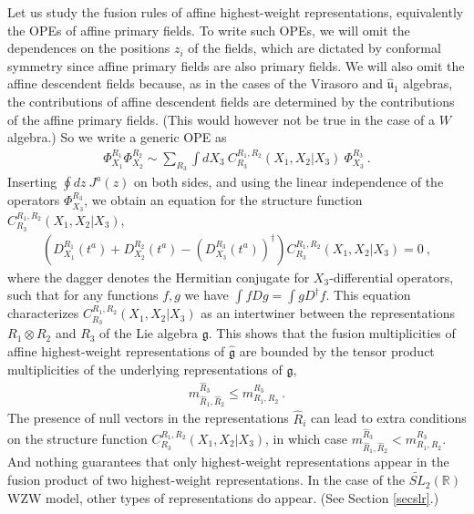 \documentclass[12pt,a4paper,notitlepage]{report}
\numberwithin{equation}{section}
\theoremstyle{break}
\begin{document}
Let us study the fusion rules of affine highest-weight representations, equivalently the OPEs of affine primary fields. To write such OPEs, we will omit the dependences on the positions $z_i$ of the fields, which are dictated by conformal symmetry since affine primary fields are also primary fields. We will also omit the affine descendent fields because, as in the cases of the Virasoro and $\hat{\mathfrak{u}}_1$ algebras, the contributions of affine descendent fields are determined by the contributions of the affine primary fields. (This would however not be true in the case of a $W$ algebra.) So we write a generic OPE as 
\begin{align}
 \Phi^{R_1}_{X_1}\Phi^{R_2}_{X_2} \sim \sum_{R_3} \int dX_3\ C^{R_1,R_2}_{R_3}(X_1,X_2|X_3)\ \Phi^{R_3}_{X_3}\ .
\end{align}
Inserting $\oint dz\ J^a(z)$ on both sides, and using the linear independence of the operators $\Phi^{R_3}_{X_3}$, we obtain an equation for the structure function $C^{R_1,R_2}_{R_3}(X_1,X_2|X_3)$,
\begin{align}
 \left(D_{X_1}^{R_1}(t^a)+D_{X_2}^{R_2}(t^a)-\left(D_{X_3}^{R_3}(t^a)\right)^\dagger\right) C^{R_1,R_2}_{R_3}(X_1,X_2|X_3) = 0\ ,
\label{dddc}
\end{align}
where the dagger denotes the Hermitian conjugate for $X_3$-differential operators, such that for any functions $f,g$ we have 
$\int fDg =\int g D^\dagger f$. This equation characterizes $C^{R_1,R_2}_{R_3}(X_1,X_2|X_3)$ as an intertwiner between the representations $R_1\otimes R_2$ and $R_3$ of the Lie algebra $\mathfrak{g}$. This shows that the fusion multiplicities of affine highest-weight representations of $\hat{\mathfrak{g}}$ are bounded by the tensor product multiplicities of the underlying representations of $\mathfrak{g}$, 
\begin{align}
 m_{\hat{R}_1,\hat{R}_2}^{\hat{R}_3} \leq m_{R_1,R_2}^{R_3}\ .
\end{align}
The presence of null vectors in the representations $\hat{R}_i$ can lead to extra conditions on the structure function $C^{R_1,R_2}_{R_3}(X_1,X_2|X_3)$, in which case $m_{\hat{R}_1,\hat{R}_2}^{\hat{R}_3} < m_{R_1,R_2}^{R_3}$. 
And nothing guarantees that only highest-weight representations appear in the fusion product of two highest-weight representations. 
In the case of the $\widetilde{SL}_2(\mathbb{R})$ WZW model, other types of representations do appear. (See Section \ref{secslr}.) 
\end{document}
